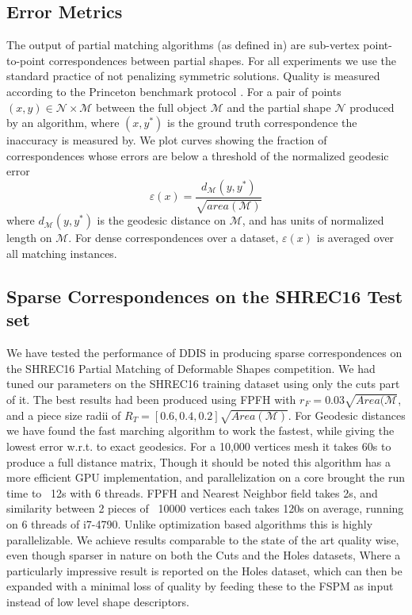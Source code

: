 \documentclass[10pt,twocolumn,letterpaper]{article}
\begin{document}
\subsection{Error Metrics}
The output of partial matching algorithms (as defined in\cite{cosmo2016shrec}) are sub-vertex point-to-point correspondences between partial shapes.
For all experiments we use the standard practice of not penalizing symmetric solutions. Quality is measured according to the Princeton benchmark protocol \cite{kim2011blended}. For a pair of points $(x,y)\in \mathcal{N}\times \mathcal{M}$ between the full object $\mathcal{M}$ and the partial shape $\mathcal{N}$ produced by an algorithm, where $(x,y^*)$ is the ground truth correspondence the inaccuracy is measured by. We plot curves showing the fraction of correspondences whose errors are below a threshold of the normalized geodesic error
\begin{equation}
\varepsilon(x)=\frac{d_{\mathcal{M}}(y,y^*)}{\sqrt{area(\mathcal{M})}}
\end{equation}
where $d_{\mathcal{M}}(y,y^*)$ is the geodesic distance on $\mathcal{M}$, and has units of normalized length on $\mathcal{M}$. For dense correspondences over a dataset, $\varepsilon(x)$ is averaged over all matching instances.

\subsection{Sparse Correspondences on the SHREC16 Test set}
We have tested the performance of DDIS in producing sparse correspondences on the SHREC16 Partial Matching of Deformable Shapes competition. 
We had tuned our parameters on the SHREC16 training dataset using only the cuts part of it. The best results had been produced using FPFH with $r_F = 0.03\sqrt{Area(\mathcal{M}}$, and a piece size radii of $R_T=[0.6,0.4,0.2]\sqrt{Area(\mathcal{M})}$. For Geodesic distances we have found the fast marching algorithm to work the fastest, while giving the lowest error w.r.t. to exact geodesics. For a 10,000 vertices mesh it takes 60s to produce a full distance matrix, Though it should be noted this algorithm has a more efficient GPU implementation, and parallelization on a core brought the run time to ~12s with 6 threads. FPFH and Nearest Neighbor field takes 2s, and similarity between 2 pieces of ~10000 vertices each takes 120s on average, running on 6 threads of i7-4790. Unlike optimization based algorithms this is highly parallelizable.
We achieve results comparable to the state of the art \cite{litany2017fully} quality wise, even though sparser in nature on both the Cuts and the Holes datasets, Where a particularly impressive result is reported on the Holes dataset, which can then be expanded with a minimal loss of quality by feeding these to the FSPM\cite{litany2017fully} as input instead of low level shape descriptors.
\end{document}
